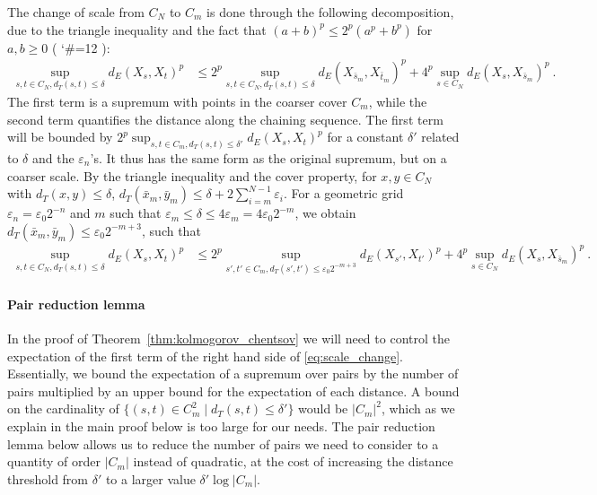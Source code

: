 \documentclass[lean]{Draft}
\makeatletter
\newcommand\leanlink{\begingroup\catcode`\#=12\relax\@leanlink}
\newcommand\@leanlink[2]{\endgroup
\href{#1}
{\texttt{\detokenize{#2}}}}
\newcommand{\docs}[1]{%
\leanlink{https://remydegenne.github.io/brownian-motion/docs/find/?pattern=#1\#doc}
{#1}}
\makeatother
\begin{document}
The change of scale from $C_N$ to $C_m$ is done through the following decomposition, due to the triangle inequality and the fact that $(a + b)^p \le 2^p (a^p + b^p)$ for $a, b \ge 0$ (\docs{scale_change_rpow}):
\begin{align*}
  \sup_{s, t \in C_N, d_T(s, t) \le \delta} d_E(X_s, X_t)^p
  &\le 2^p \sup_{s, t \in C_N, d_T(s, t) \le \delta} d_E(X_{\bar{s}_m}, X_{\bar{t}_m})^p + 4^p \sup_{s \in C_N} d_E(X_s, X_{\bar{s}_m})^p
  \: .
\end{align*}
The first term is a supremum with points in the coarser cover $C_m$, while the second term quantifies the distance along the chaining sequence.
The first term will be bounded by $2^p \sup_{s, t \in C_m, d_T(s, t) \le \delta'} d_E(X_s, X_t)^p$ for a constant $\delta'$ related to $\delta$ and the $\varepsilon_n$'s.
It thus has the same form as the original supremum, but on a coarser scale.
By the triangle inequality and the cover property, for $x, y \in C_N$ with $d_T(x, y) \le \delta$, $d_T(\bar{x}_m, \bar{y}_m) \le \delta + 2 \sum_{i=m}^{N-1}\varepsilon_i$.
For a geometric grid $\varepsilon_n = \varepsilon_0 2^{-n}$ and $m$ such that $\varepsilon_m \le \delta \le 4 \varepsilon_m = 4 \varepsilon_0 2^{-m}$, we obtain $d_T(\bar{x}_m, \bar{y}_m) \le \varepsilon_0 2^{-m+3}$, such that
\begin{align}
  \sup_{s, t \in C_N, d_T(s, t) \le \delta} d_E(X_s, X_t)^p
  &\le 2^p \sup_{s', t' \in C_m, d_T(s', t') \le \varepsilon_0 2^{-m+3}} d_E(X_{s'}, X_{t'})^p + 4^p \sup_{s \in C_N} d_E(X_s, X_{\bar{s}_m})^p
  \: . \label{eq:scale_change}
\end{align}

\paragraph{Pair reduction lemma}

In the proof of Theorem~\ref{thm:kolmogorov_chentsov} we will need to control the expectation of the first term of the right hand side of \eqref{eq:scale_change}.
Essentially, we bound the expectation of a supremum over pairs by the number of pairs multiplied by an upper bound for the expectation of each distance.
A bound on the cardinality of $\{(s, t) \in C_m^2 \mid d_T(s, t) \le \delta'\}$ would be $\lvert C_m \rvert^2$, which as we explain in the main proof below is too large for our needs.
The pair reduction lemma below allows us to reduce the number of pairs we need to consider to a quantity of order $\lvert C_m \rvert$ instead of quadratic, at the cost of increasing the distance threshold from $\delta'$ to a larger value $\delta' \log \lvert C_m \rvert$.
\end{document}

